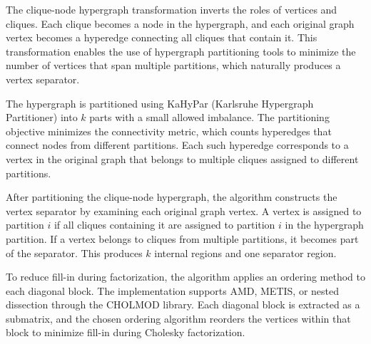 The clique-node hypergraph transformation inverts the roles of vertices and cliques. Each clique becomes a node in the hypergraph, and each original graph vertex becomes a hyperedge connecting all cliques that contain it. This transformation enables the use of hypergraph partitioning tools to minimize the number of vertices that span multiple partitions, which naturally produces a vertex separator.

The hypergraph is partitioned using KaHyPar (Karlsruhe Hypergraph Partitioner) \cite{DBLP:phd/dnb/Schlag20, 10.1145/3529090, ahss2017alenex} into $k$ parts with a small allowed imbalance. The partitioning objective minimizes the connectivity metric, which counts hyperedges that connect nodes from different partitions. Each such hyperedge corresponds to a vertex in the original graph that belongs to multiple cliques assigned to different partitions.

After partitioning the clique-node hypergraph, the algorithm constructs the vertex separator by examining each original graph vertex. A vertex is assigned to partition $i$ if all cliques containing it are assigned to partition $i$ in the hypergraph partition. If a vertex belongs to cliques from multiple partitions, it becomes part of the separator. This produces $k$ internal regions and one separator region.

To reduce fill-in during factorization, the algorithm applies an ordering method to each diagonal block. The implementation supports AMD, METIS, or nested dissection through the CHOLMOD library. Each diagonal block is extracted as a submatrix, and the chosen ordering algorithm reorders the vertices within that block to minimize fill-in during Cholesky factorization.


